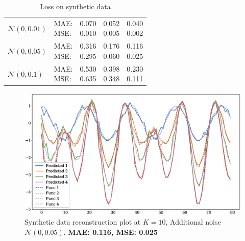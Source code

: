 \documentclass{article}
\begin{document}
{\begin{table}[!h]
\def\arraystretch{2.3}
\begin{center}
\caption{Loss on synthetic data}
\begin{tabular}{|l||l||*{3}{c|}}\hline
	\backslashbox{Noise}{Parameters}
	&\makebox[3em]{Metric}&\makebox[3em]{$K=2$}&\makebox[3em]{$K=4$}&\makebox[3em]{$K=10$}\\\hline
	$\mathcal{N}(0, 0.01)$&\makecell{ MAE: \\ MSE: } &\makecell{ 0.070 \\ 0.010 }&\makecell{ 0.052 \\ 0.005 }&\makecell{ 0.040 \\ 0.002 }\\\hline
	$\mathcal{N}(0, 0.05)$&\makecell{ MAE: \\ MSE: } &\makecell{ 0.316 \\ 0.295 }&\makecell{ 0.176 \\ 0.060 }&\makecell{ 0.116 \\ 0.025 }\\\hline
	$\mathcal{N}(0, 0.1)$& \makecell{ MAE: \\ MSE: } &\makecell{ 0.530 \\ 0.635 }&\makecell{ 0.398 \\ 0.348 }&\makecell{ 0.230 \\ 0.111 }\\\hline
\end{tabular}
\end{center}
\end{table}


\begin{figure}[H]
	\centering
	\includegraphics[width=\textwidth]{synthetic_time_series_K10N005.eps}
	\caption{Synthetic data reconstruction plot at $K=10$, Additional noise $\mathcal{N}(0, 0.05)$. \textbf{MAE: 0.116, MSE: 0.025}}
	\label{fig:fig6}
\end{figure}

}
\end{document}
